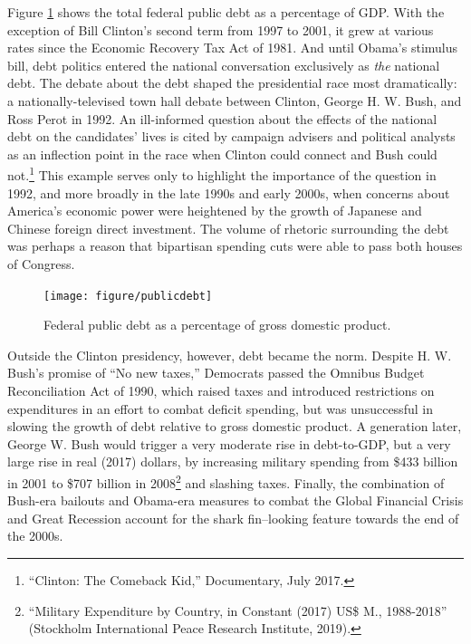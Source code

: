 \documentclass[12pt,oneside]{psthesis}
\begin{document}
Figure \ref{fig:publicdebt} shows the total federal public debt as a percentage of GDP.
With the exception of Bill Clinton's second term from 1997 to 2001, it grew at various rates since the Economic Recovery Tax Act of 1981.
And until Obama's stimulus bill, debt politics entered the national conversation exclusively as \emph{the} national debt.
The debate about the debt shaped the presidential race most dramatically: a nationally-televised town hall debate between Clinton, George H. W. Bush, and Ross Perot in 1992.
An ill-informed question about the effects of the national debt on the candidates' lives is cited by campaign advisers and political analysts as an inflection point in the race when Clinton could connect and Bush could not.\footnote{``Clinton: The Comeback Kid,'' Documentary, July 2017.}
This example serves only to highlight the importance of the question in 1992, and more broadly in the late 1990s and early 2000s, when concerns about America's economic power were heightened by the growth of Japanese and Chinese foreign direct investment.
The volume of rhetoric surrounding the debt was perhaps a reason that bipartisan spending cuts were able to pass both houses of Congress.
\begin{figure}

{\centering \texttt{[image: figure/publicdebt]} 

}

\caption{Federal public debt as a percentage of gross domestic product.}\label{fig:publicdebt}
\end{figure}
Outside the Clinton presidency, however, debt became the norm.
Despite H. W. Bush's promise of ``No new taxes,'' Democrats passed the Omnibus Budget Reconciliation Act of 1990, which raised taxes and introduced restrictions on expenditures in an effort to combat deficit spending, but was unsuccessful in slowing the growth of debt relative to gross domestic product.
A generation later, George W. Bush would trigger a very moderate rise in debt-to-GDP, but a very large rise in real (2017) dollars, by increasing military spending from \$433 billion in 2001 to \$707 billion in 2008\footnote{``Military Expenditure by Country, in Constant (2017) US\$ M., 1988-2018'' (Stockholm International Peace Research Institute, 2019).} and slashing taxes.
Finally, the combination of Bush-era bailouts and Obama-era measures to combat the Global Financial Crisis and Great Recession account for the shark fin--looking feature towards the end of the 2000s.
\end{document}
